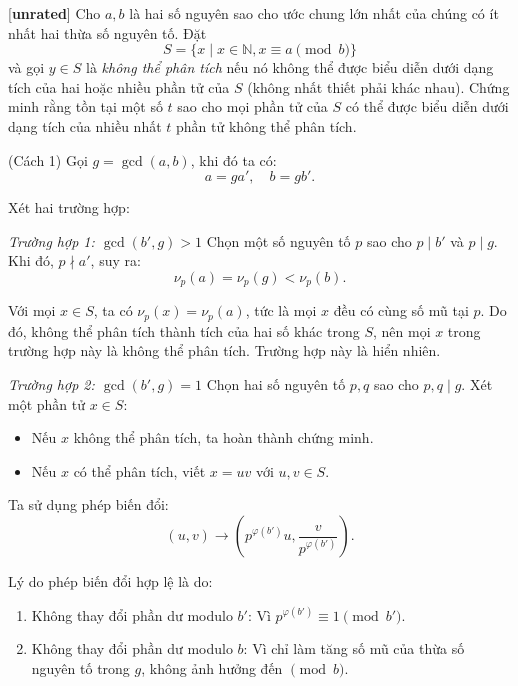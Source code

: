 \documentclass[../06-largest-exponent.tex]{subfiles}
\begin{document}
\begin{example*}\label{example:CHN-2015-TST3-D1-P3}[\textbf{unrated}]
	Cho \( a, b \) là hai số nguyên sao cho ước chung lớn nhất của chúng có ít nhất hai thừa số nguyên tố.  
	Đặt  
	\[
		S = \{ x \mid x \in \mathbb{N}, x \equiv a \pmod{b} \}
	\]
	và gọi \( y \in S \) là \textit{không thể phân tích} nếu nó không thể được biểu diễn
	dưới dạng tích của hai hoặc nhiều phần tử của \( S \) (không nhất thiết phải khác nhau).  
	Chứng minh rằng tồn tại một số \( t \) sao cho mọi phần tử của \( S \) có thể được biểu diễn
	dưới dạng tích của nhiều nhất \( t \) phần tử không thể phân tích.
\end{example*}

\begin{soln}(Cách 1)\footnotemark
	Gọi \( g = \gcd(a, b) \), khi đó ta có:
	\[
		a = g a', \quad b = g b'.
	\]
	
	Xét hai trường hợp:

	\textit{Trường hợp 1: \( \gcd(b', g) > 1 \)}
	Chọn một số nguyên tố \( p \) sao cho \( p \mid b' \) và \( p \mid g \). Khi đó, \( p \nmid a' \), suy ra:
	\[
		\nu_p(a) = \nu_p(g) < \nu_p(b).
	\]
	
	Với mọi \( x \in S \), ta có \( \nu_p(x) = \nu_p(a) \), tức là mọi \( x \) đều có cùng số mũ tại \( p \).
	Do đó, không thể phân tích thành tích của hai số khác trong \( S \), nên mọi \( x \) trong trường hợp này là không thể phân tích.
	Trường hợp này là hiển nhiên.
	
	\textit{Trường hợp 2: \( \gcd(b', g) = 1 \)}
	Chọn hai số nguyên tố \( p, q \) sao cho \( p, q \mid g \). Xét một phần tử \( x \in S \):
	\begin{itemize}[topsep=0pt, partopsep=0pt, itemsep=0pt]
		\item Nếu \( x \) không thể phân tích, ta hoàn thành chứng minh.
		\item Nếu \( x \) có thể phân tích, viết \( x = uv \) với \( u, v \in S \).
	\end{itemize}
	
	Ta sử dụng phép biến đổi:
	\[
		(u, v) \to \left(p^{\varphi(b')} u, \frac{v}{p^{\varphi(b')}}\right).
	\]
	
	Lý do phép biến đổi hợp lệ là do:
	\begin{enumerate}
		\item Không thay đổi phần dư modulo \( b' \): Vì \( p^{\varphi(b')} \equiv 1 \pmod{b'} \).
		\item Không thay đổi phần dư modulo \( b \): Vì chỉ làm tăng số mũ của thừa số nguyên tố trong \( g \), không ảnh hưởng đến \( \pmod{b} \).
	\end{enumerate}
	

\end{soln}
\end{document}
